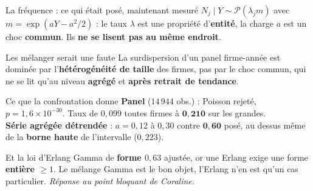 \documentclass[11pt]{beamer}
\begin{document}
\begin{frame}{La fréquence : ce qui était posé, maintenant mesuré}
\footnotesize
$N_j \mid Y \sim \mathcal{P}(\lambda_j m)$ avec $m=\exp(aY-a^2/2)$ : le taux $\lambda$ est
une propriété d'\textbf{entité}, la charge $a$ est un choc \textbf{commun}. Ils \textbf{ne
se lisent pas au même endroit}.
\vspace{1mm}
\begin{block}{Les mélanger serait une faute}
La surdispersion d'un panel firme-année est dominée par l'\textbf{hétérogénéité de taille}
des firmes, pas par le choc commun, qui ne se lit qu'au niveau \textbf{agrégé} et
\textbf{après retrait de tendance}.
\end{block}
\begin{block}{Ce que la confrontation donne}
\textbf{Panel} ($14\,944$ obs.) : Poisson rejeté, $p=1{,}6\times10^{-30}$. Taux de
$0{,}099$ toutes firmes à $\mathbf{0{,}210}$ sur les grandes.\\[2pt]
\textbf{Série agrégée détrendée} : $a=0{,}12$ à $0{,}30$ contre $\mathbf{0{,}60}$ posé, au
dessus même de la \textbf{borne haute} de l'intervalle ($0{,}223$).
\end{block}
\begin{block}{Et la \og{}loi d'Erlang\fg{}}
Gamma de \textbf{forme $0{,}63$} ajustée, or une Erlang exige une forme \textbf{entière
$\ge 1$}. Le mélange Gamma est le bon objet, l'Erlang n'en est qu'un cas particulier.
\emph{Réponse au point bloquant de Coraline.}
\end{block}
\end{frame}
\end{document}
